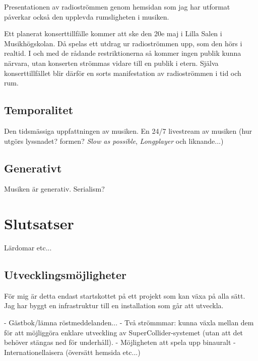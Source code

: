 \documentclass[11pt, a4paper]{article} %
\begin{document}
Presentationen av radioströmmen genom hemsidan som jag har utformat påverkar också den upplevda rumsligheten i musiken. 

Ett planerat konserttillfälle kommer att ske den 20e maj i Lilla Salen i Musikhögskolan. Då spelas ett utdrag ur radioströmmen upp, som den hörs i realtid. I och med de rådande restriktionerna så kommer ingen publik kunna närvara, utan konserten strömmas vidare till en publik i etern. Själva konserttillfället blir därför en sorts manifestation av radioströmmen i tid och rum. 




\subsection*{Temporalitet}
Den tidsmässiga uppfattningen av musiken. En 24/7 livestream av musiken (hur utgörs lyssnadet? formen? \emph{Slow as possible}, \emph{Longplayer} och liknande...)

\subsection*{Generativt}
Musiken är generativ. Serialism?

\section*{Slutsatser}
Lärdomar etc...

\subsection*{Utvecklingsmöjligheter}
För mig är detta endast startskottet på ett projekt som kan växa på alla sätt. Jag har byggt en infrastruktur till en installation som går att utveckla.

- Gästbok/lämna röstmeddelanden...
- Två strömmmar: kunna växla mellan dem för att möjliggöra enklare utveckling av SuperCollider-systemet (utan att det behöver stängas ned för underhåll).
- Möjligheten att spela upp binauralt
- Internationellaisera (översätt hemsida etc...)



{}
\printbibheading
\printbibliography[type=article,title={Artiklar},heading=subbibintoc]
\printbibliography[type=book,title={Böcker},heading=subbibintoc]
\printbibliography[type=online,title={Hemsidor},heading=subbibintoc]
\printbibliography[type=audio,title={Musik},heading=subbibintoc]
\printbibliography[type=misc,title={Radio},heading=subbibintoc]
\printbibliography[type=incollection,title={Samlingar},heading=subbibintoc]

\clearpage
\begin{appendices}
\printglossaries
\end{appendices}
\end{document}
